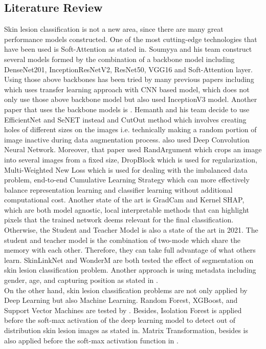 \subsection{Literature Review}
Skin lesion classification is not a new area, since there are many great performance models constructed. One of the most cutting-edge technologies that have been used is Soft-Attention as stated in\cite{03358}. Soumyya and his team construct several models formed by the combination of a backbone model including DenseNet201\cite{06993}, InceptionResNetV2\cite{00567}, ResNet50\cite{03385}\cite{05027}, VGG16\cite{1556} and Soft-Attention layer. Using those above backbones has been tried by many previous papers including \cite{03798} which uses transfer learning approach with CNN based model, \cite{10348} which does not only use those above backbone model but also used InceptionV3\cite{00567} model. Another paper that uses the backbone models is \cite{09418}. Hemanth and his team decide to use EfficientNet\cite{11946} and SeNET\cite{01507} instead and CutOut\cite{04552v2} method which involves creating holes of different sizes on the images i.e. technically making a random portion of image inactive during data augmentation process. \cite{01284} also used Deep Convolution Neural Network. Moreover, that paper used RandArgument which crops an image into several images from a fixed size, DropBlock which is used for regularization, Multi-Weighted New Loss which is used for dealing with the imbalanced data problem, end-to-end Cumulative Learning Strategy which can more effectively balance representation learning and classifier learning without additional computational cost. Another state of the art is GradCam and Kernel SHAP\cite{06612}, which are both model agnostic, local interpretable methods that can highlight pixels that the trained network deems relevant for the final classification.\\
Otherwise, the Student and Teacher Model is also a state of the art in 2021\cite{03225}. The student and teacher model is the combination of two-mode which share the memory with each other. Therefore, they can take full advantage of what others learn. SkinLinkNet\cite{12602} and WonderM\cite{03426} are both tested the effect of segmentation on skin lesion classification problem. Another approach is using metadata including gender, age, and capturing position as stated in \cite{03910}. \\
On the other hand, skin lesion classification problems are not only applied by Deep Learning but also Machine Learning. Random Forest, XGBoost, and Support Vector Machines are tested by \cite{03798}. Besides, Isolation Forest is applied before the soft-max activation of the deep learning model to detect out of distribution skin lesion images as stated in\cite{10348}. Matrix Transformation, besides is also applied before the soft-max activation function in \cite{05045}. 

